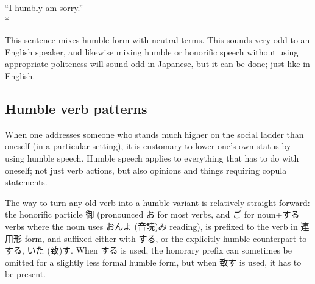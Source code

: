 \documentclass[11pt, b5paper, twoside, openright, onecolumn]{book}
\makeatletter
\newcommand*{\rubystack}[2]{{\relscale{0.5}%
  \begin{tabular}[b]{@{}c@{}}%
    {#1}\\%
   {\textscale{2}{#2}}%
  \end{tabular}}%
}
\DeclareRobustCommand*{\ruby}[2]{%
  \mbox{%
    \setlength{\parskip}{0ex}%
    \BeginAccSupp{method=pdfstringdef,ActualText={#1}}%
      \rubystack{\phantom{#2}}{#1}%
      \llap{%
        \rubystack{#2}{\phantom{#1}}%
      }%
    \EndAccSupp{}%
  }%
}
\renewcommand*{\ruby}[2]{#2 (#1)}%
\newenvironment{exampleblock}{
\setlength{\parindent}{0.6in}
\begin{minipage}[t]{\dimexpr\textwidth-\parindent}}
{\end{minipage}}
\makeatother
\begin{document}
\vspace{0.4cm}
\begin{exampleblock}
“I humbly am sorry.” \\* 
\end{exampleblock}
\vspace{0.2cm}

This sentence mixes humble form with neutral terms. This sounds very odd to an English speaker‚ and likewise mixing humble or honorific speech without using appropriate politeness will sound odd in Japanese‚ but it can be done; just like in English.

\subsection{Humble verb patterns}

When one addresses someone who stands much higher on the social ladder than oneself (in a particular setting)‚ it is customary to lower one’s own status by using humble speech. Humble speech applies to everything that has to do with oneself; not just verb actions‚ but also opinions and things requiring copula statements.

The way to turn any old verb into a humble variant is relatively straight forward: the honorific particle 御 (pronounced お for most verbs‚ and ご for noun+する verbs where the noun uses \ruby{音読}{おんよ}み reading)‚ is prefixed to the verb in 連用形 form‚ and suffixed either with する‚ or the explicitly humble counterpart to する‚ \ruby{致}{いた}す. When する is used‚ the honorary prefix can sometimes be omitted for a slightly less formal humble form‚ but when 致す is used‚ it has to be present.
\end{document}
